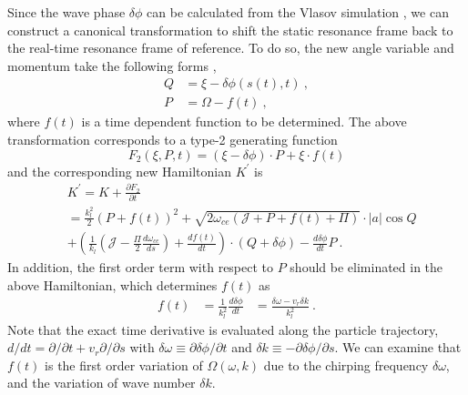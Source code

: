 Since the wave phase $\delta \phi$ can be calculated from the Vlasov simulation
 \cite{zheng2024}, we can construct a canonical transformation to shift the static resonance frame back to the real-time resonance frame of reference.
To do so, the new angle variable and momentum  take the following forms \cite{berk1999},
\begin{equation}
    \begin{aligned}
        Q &= \xi - \delta \phi(s(t),t)~,
        \\
        P & = \Omega - f(t)~,
    \end{aligned}
\end{equation}
where $f(t)$ is a time dependent function to be determined.
The above transformation corresponds to a type-2 generating function
\begin{equation}
    F_2(\xi,P,t) = (\xi - \delta \phi) \cdot P + \xi \cdot f(t)
\end{equation}
and the corresponding new Hamiltonian $K^\prime$ is
\begin{equation}
    \begin{aligned}
        &  K^\prime = K + \frac{\partial F_2}{\partial t}
        \\
        & = \frac{k_l^2}{2}(P+f(t))^2 
        + \sqrt{2\omega_{ce}(\mathcal{J}+P+f(t)+\Pi)} \cdot |a|\cos Q 
        \\
        & + \left(\frac{1}{k_l}\left(\mathcal{J} - \frac{\Pi}{2} \frac{d\omega_{ce}}{ds}\right)  +\frac{d f(t)}{d t} \right)\cdot(Q + \delta \phi)  - \frac{d \delta \phi}{d t} P ~. 
        \end{aligned}
\end{equation}
In addition,  the first order term with respect to $P$  should be eliminated in the above Hamiltonian, which determines $f(t)$ as
\begin{equation}\label{eq.ft}
    \begin{aligned}
    f(t) & = \frac{1}{k_l^2} \frac{d \delta \phi}{d t}  &= \frac{\delta \omega - v_r \delta k}{k_l^2}~.
    \end{aligned}
\end{equation} 
Note that the exact time derivative is evaluated along the particle trajectory, $d/dt = \partial/\partial t + v_r \partial /\partial s$ with $\delta \omega  \equiv \partial \delta \phi/\partial t$ and $\delta k  \equiv -\partial \delta \phi/\partial s$.
We can examine that $f(t)$ is the first order variation of $\Omega(\omega,k)$ due to the chirping frequency $\delta \omega$, and the variation of wave number $\delta k$.

